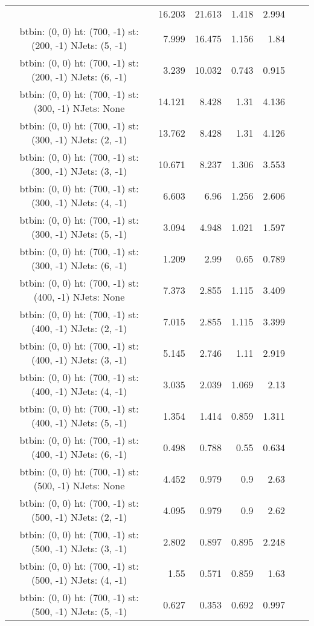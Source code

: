 \documentclass[12pt]{paper}
\begin{document}
\begin{landscape}
\begin{longtable}{c|r|r|r|r|r|r}
 & 16.203 & 21.613 & 1.418 & 2.994\\
btbin:  (0, 0) ht:  (700, -1) st:  (200, -1) NJets:  (5, -1)
 & 7.999 & 16.475 & 1.156 & 1.84\\
btbin:  (0, 0) ht:  (700, -1) st:  (200, -1) NJets:  (6, -1)
 & 3.239 & 10.032 & 0.743 & 0.915\\
btbin:  (0, 0) ht:  (700, -1) st:  (300, -1) NJets:  None
 & 14.121 & 8.428 & 1.31 & 4.136\\
btbin:  (0, 0) ht:  (700, -1) st:  (300, -1) NJets:  (2, -1)
 & 13.762 & 8.428 & 1.31 & 4.126\\
btbin:  (0, 0) ht:  (700, -1) st:  (300, -1) NJets:  (3, -1)
 & 10.671 & 8.237 & 1.306 & 3.553\\
btbin:  (0, 0) ht:  (700, -1) st:  (300, -1) NJets:  (4, -1)
 & 6.603 & 6.96 & 1.256 & 2.606\\
btbin:  (0, 0) ht:  (700, -1) st:  (300, -1) NJets:  (5, -1)
 & 3.094 & 4.948 & 1.021 & 1.597\\
btbin:  (0, 0) ht:  (700, -1) st:  (300, -1) NJets:  (6, -1)
 & 1.209 & 2.99 & 0.65 & 0.789\\
btbin:  (0, 0) ht:  (700, -1) st:  (400, -1) NJets:  None
 & 7.373 & 2.855 & 1.115 & 3.409\\
btbin:  (0, 0) ht:  (700, -1) st:  (400, -1) NJets:  (2, -1)
 & 7.015 & 2.855 & 1.115 & 3.399\\
btbin:  (0, 0) ht:  (700, -1) st:  (400, -1) NJets:  (3, -1)
 & 5.145 & 2.746 & 1.11 & 2.919\\
btbin:  (0, 0) ht:  (700, -1) st:  (400, -1) NJets:  (4, -1)
 & 3.035 & 2.039 & 1.069 & 2.13\\
btbin:  (0, 0) ht:  (700, -1) st:  (400, -1) NJets:  (5, -1)
 & 1.354 & 1.414 & 0.859 & 1.311\\
btbin:  (0, 0) ht:  (700, -1) st:  (400, -1) NJets:  (6, -1)
 & 0.498 & 0.788 & 0.55 & 0.634\\
btbin:  (0, 0) ht:  (700, -1) st:  (500, -1) NJets:  None
 & 4.452 & 0.979 & 0.9 & 2.63\\
btbin:  (0, 0) ht:  (700, -1) st:  (500, -1) NJets:  (2, -1)
 & 4.095 & 0.979 & 0.9 & 2.62\\
btbin:  (0, 0) ht:  (700, -1) st:  (500, -1) NJets:  (3, -1)
 & 2.802 & 0.897 & 0.895 & 2.248\\
btbin:  (0, 0) ht:  (700, -1) st:  (500, -1) NJets:  (4, -1)
 & 1.55 & 0.571 & 0.859 & 1.63\\
btbin:  (0, 0) ht:  (700, -1) st:  (500, -1) NJets:  (5, -1)
 & 0.627 & 0.353 & 0.692 & 0.997\\

\end{longtable}
\end{landscape}
\end{document}
